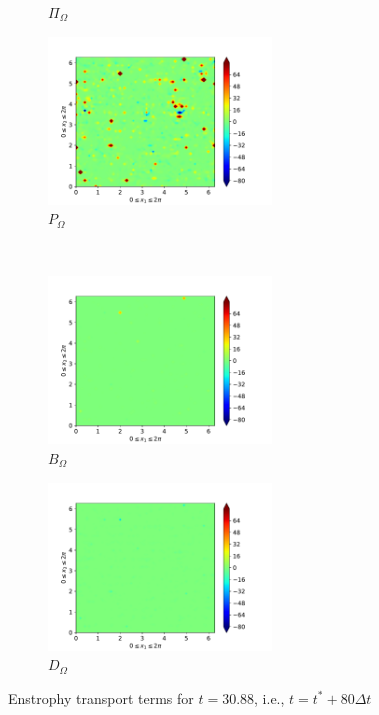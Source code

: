 \begin{figure}[H]
\begin{subfigure}{0.45\textwidth}
        \caption{$\Pi_{\Omega}$}
    \end{subfigure}
    \newline
    \begin{subfigure}{0.45\textwidth}
        \includegraphics[height=1.75in]{media/run-cds-65/P-enst-1420}
        \caption{$P_{\Omega}$}
    \end{subfigure}
    ~
    \begin{subfigure}{0.45\textwidth}
        \includegraphics[height=1.75in]{media/run-cds-65/B-enst-1420}
        \caption{$B_{\Omega}$}
    \end{subfigure}
    \newline
    \begin{subfigure}{0.45\textwidth}
        \includegraphics[height=1.75in]{media/run-cds-65/D-enst-1420}
        \caption{$D_{\Omega}$}
    \end{subfigure}
    \caption{Enstrophy transport terms for $t=30.88$, i.e., $t=t^{\ast} + 80 \Delta t$}
\end{figure}

\newpage

